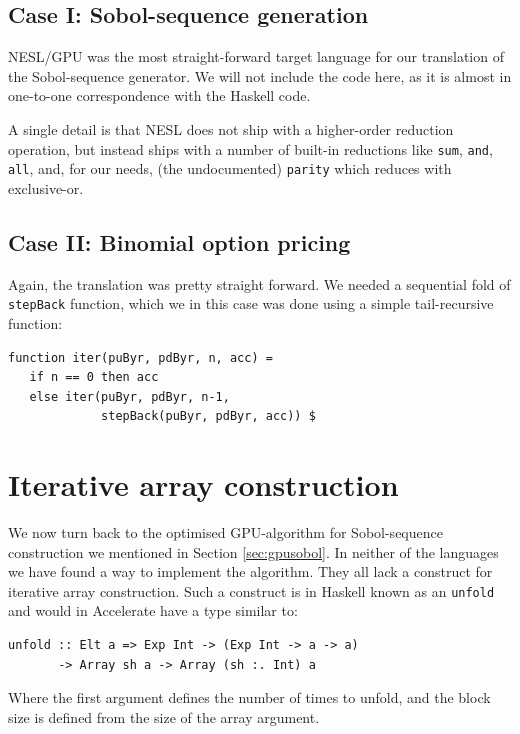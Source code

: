 \documentclass[preprint]{sigplanconf}
\begin{document}
\subsection{Case I: Sobol-sequence generation}
NESL/GPU was the most straight-forward target language for our
translation of the Sobol-sequence generator. We will not include the
code here, as it is almost in one-to-one correspondence with the
Haskell code. 

A single detail is that NESL does not ship with a higher-order
reduction operation, but instead ships with a number of built-in
reductions like \verb|sum|, \verb|and|, \verb|all|, and, for our needs,
(the undocumented) \verb|parity| which reduces with exclusive-or.

\subsection{Case II: Binomial option pricing}
Again, the translation was pretty straight forward. We needed a
sequential fold of \verb|stepBack| function, which we in this case was
done using a simple tail-recursive function:
\begin{verbatim}
function iter(puByr, pdByr, n, acc) =
   if n == 0 then acc
   else iter(puByr, pdByr, n-1, 
             stepBack(puByr, pdByr, acc)) $
\end{verbatim}


\section{Iterative array construction}
\label{sec:itercons}
We now turn back to the optimised GPU-algorithm for Sobol-sequence
construction we mentioned in Section \ref{sec:gpusobol}. In neither of
the languages we have found a way to implement the algorithm. They all
lack a construct for iterative array construction. Such a construct is
in Haskell known as an \verb|unfold| and would in Accelerate have a type
similar to:

\begin{verbatim}
unfold :: Elt a => Exp Int -> (Exp Int -> a -> a)
       -> Array sh a -> Array (sh :. Int) a
\end{verbatim}
Where the first argument defines the number of times to unfold, and
the block size is defined from the size of the array argument.
\end{document}
